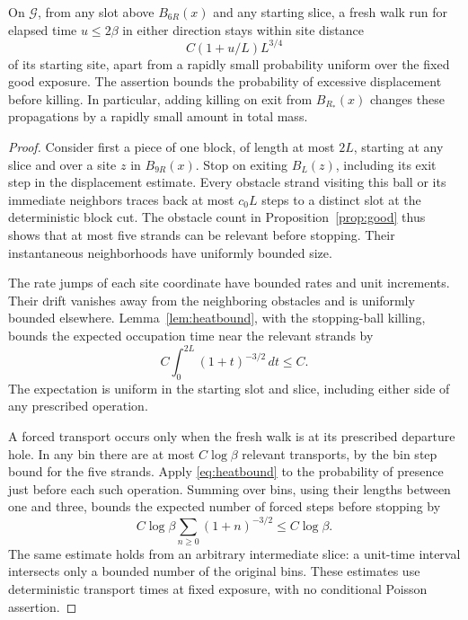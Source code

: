 \begin{lemma}\label{lem:localization}
On $\mathcal G$, from any slot above $B_{6R}(x)$ and any starting
slice, a fresh walk run for elapsed time $u\le2\beta$ in either
direction stays within site distance
\begin{equation}\label{eq:localization}
 C(1+u/L)L^{3/4}
\end{equation}
of its starting site, apart from a rapidly small probability uniform
over the fixed good exposure.  The assertion bounds the probability
of excessive displacement before killing.  In particular, adding
killing on exit from $B_{R_*}(x)$ changes these propagations by a
rapidly small amount in total mass.
\end{lemma}

\begin{proof}
Consider first a piece of one block, of length at most $2L$, starting
at any slice and over a site $z$ in $B_{9R}(x)$.  Stop on exiting
$B_L(z)$, including its exit step in the displacement estimate.
Every obstacle strand visiting this ball or its immediate neighbors
traces back at most $c_0L$ steps to a distinct slot at the deterministic
block cut.  The obstacle count in Proposition~\ref{prop:good} thus
shows that at most five strands can be relevant before stopping.
Their instantaneous neighborhoods have uniformly bounded size.

The rate jumps of each site coordinate have bounded rates and unit
increments.  Their drift vanishes away from the neighboring obstacles
and is uniformly bounded elsewhere.  Lemma~\ref{lem:heatbound}, with
the stopping-ball killing, bounds the expected occupation time near
the relevant strands by
\[
 C\int_0^{2L}(1+t)^{-3/2}\,dt\le C.
\]
The expectation is uniform in the starting slot and slice, including
either side of any prescribed operation.

A forced transport occurs only when the fresh walk is at its prescribed
departure hole.  In any bin there are at most $C\log\beta$ relevant
transports, by the bin step bound for the five strands.  Apply
\eqref{eq:heatbound} to the probability of presence just before each
such operation.  Summing over bins, using their lengths between one
and three, bounds the expected number of forced steps before stopping
by
\[
 C\log\beta\sum_{n\ge0}(1+n)^{-3/2}\le C\log\beta.
\]
The same estimate holds from an arbitrary intermediate slice: a
unit-time interval intersects only a bounded number of the original
bins.  These estimates use deterministic transport times at fixed
exposure, with no conditional Poisson assertion.


\end{proof}
